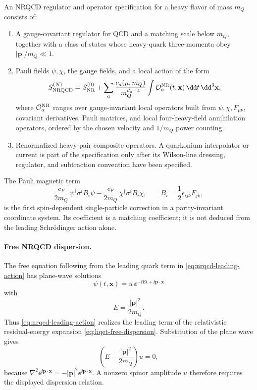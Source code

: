 \begin{definition}
\label{def:nrqcd-regulator-operator-specification}
An NRQCD regulator and operator specification for a heavy flavor of mass
\(m_Q\) consists of:
\begin{enumerate}
  \item A gauge-covariant regulator for QCD and a matching scale below
  \(m_Q\), together with a class of states whose heavy-quark three-momenta
  obey \(|\mathbf p|/m_Q\ll1\).
  \item Pauli fields \(\psi,\chi\), the gauge fields, and a local action of
  the form
  \[
    S_{\rm NRQCD}^{(N)}
    =
    S_{\rm NR}^{(0)}
    +
    \sum_{a}\frac{c_a(\mu,m_Q)}{m_Q^{d_a-4}}
    \int \mathcal O_a^{\rm NR}(t,\mathbf x)\,\dd t\,\dd^3\mathbf x ,
  \]
  where \(\mathcal O_a^{\rm NR}\) ranges over gauge-invariant local operators
  built from \(\psi,\chi,F_{\mu\nu}\), covariant derivatives, Pauli matrices,
  and local four-heavy-field annihilation operators, ordered by the chosen
  velocity and \(1/m_Q\) power counting.
  \item Renormalized heavy-pair composite operators.  A quarkonium interpolator
  or current is part of the specification only after its Wilson-line dressing,
  regulator, and subtraction convention have been specified.
\end{enumerate}
The Pauli magnetic term
\[
  \frac{c_F}{2m_Q}\,
  \psi^\dagger\sigma^iB_i\psi
  -
  \frac{c_F}{2m_Q}\,
  \chi^\dagger\sigma^iB_i\chi,
  \qquad
  B_i=\frac12\epsilon_{ijk}F_{jk},
\]
is the first spin-dependent single-particle correction in a parity-invariant
coordinate system.  Its coefficient is a matching coefficient; it is not
deduced from the leading Schrödinger action alone.
\end{definition}

\paragraph{Free NRQCD dispersion.}
The free equation following from the leading quark term in
\eqref{eq:nrqcd-leading-action} has plane-wave solutions
\[
  \psi(t,\mathbf x)=u\,\ee^{-\ii Et+\ii\mathbf p\cdot\mathbf x}
\]
with
\[
  E=\frac{|\mathbf p|^2}{2m_Q}.
\]
Thus \eqref{eq:nrqcd-leading-action} realizes the leading term of the
relativistic residual-energy expansion
\eqref{eq:hqet-free-dispersion}.
Substitution of the plane wave gives
\[
  \left(E-\frac{|\mathbf p|^2}{2m_Q}\right)u=0,
\]
because \(\nabla^2\ee^{\ii\mathbf p\cdot\mathbf x}
=-|\mathbf p|^2\ee^{\ii\mathbf p\cdot\mathbf x}\).  A nonzero spinor
amplitude \(u\) therefore requires the displayed dispersion relation.

